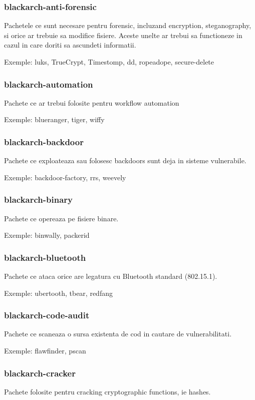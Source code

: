 \documentclass[a4paper, oneside, 11pt]{book}
\begin{document}
\subsubsection{blackarch-anti-forensic}
Pachetele ce sunt necesare pentru forensic,
incluzand encryption, steganography, si orice  ar trebuie sa modifice fisiere.
Aceste unelte ar trebui sa functioneze in cazul in care doriti sa ascundeti informatii.

Exemple: luks, TrueCrypt, Timestomp, dd, ropeadope, secure-delete

\subsubsection{blackarch-automation}
Pachete ce ar trebui folosite pentru workflow automation

Exemple: blueranger, tiger, wiffy

\subsubsection{blackarch-backdoor}
Pachete ce  exploateaza sau folosesc backdoors sunt  deja  in sisteme vulnerabile.

Exemple: backdoor-factory, rrs, weevely

\subsubsection{blackarch-binary}
Pachete ce opereaza pe fisiere binare.

Exemple: binwally, packerid

\subsubsection{blackarch-bluetooth}
Pachete ce ataca orice are legatura cu Bluetooth standard (802.15.1).

Exemple: ubertooth, tbear, redfang

\subsubsection{blackarch-code-audit}
Pachete ce  scaneaza o sursa existenta de cod in cautare de vulnerabilitati.

Exemple: flawfinder, pscan

\subsubsection{blackarch-cracker}
Pachete folosite pentru cracking cryptographic functions, ie hashes.
\end{document}
